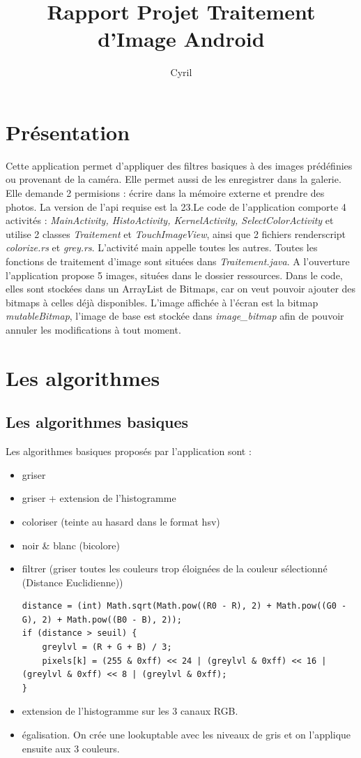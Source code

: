 \documentclass[a4paper, 12pt]{report}
\title{Rapport Projet Traitement d'Image Android}
\author{Cyril \bsc {CAULONQUE}}
\date {}
\begin{document}
\maketitle
\newpage
\tableofcontents
\newpage
\section{Présentation}
Cette application permet d'appliquer des filtres basiques à des images prédéfinies ou provenant de la caméra. Elle permet aussi de les enregistrer dans la galerie. Elle demande 2 permisions : écrire dans la mémoire externe et prendre des photos. La version de l'api requise est la 23.\newline Le code de l'application comporte 4 activités : \emph{MainActivity, HistoActivity, KernelActivity, SelectColorActivity} et utilise 2 classes \emph{Traitement} et \emph{TouchImageView}, ainsi que 2 fichiers renderscript \emph{colorize.rs} et \emph{grey.rs}.\newline
L'activité main appelle toutes les autres. Toutes les fonctions de traitement d'image sont situées dans \emph{Traitement.java}.
A l'ouverture l'application propose 5 images, situées dans le dossier ressources. Dans le code, elles sont stockées dans un ArrayList de Bitmaps, car on veut pouvoir ajouter des bitmaps à celles déjà disponibles. L'image affichée à l'écran est la bitmap \emph{mutableBitmap}, l'image de base est stockée dans \emph{image\_bitmap} afin de pouvoir annuler les modifications à tout moment.
\section{Les algorithmes}
\subsection{Les algorithmes basiques}
Les algorithmes basiques proposés par l'application sont :\newline
\begin{itemize}
\item griser
\item griser + extension de l'histogramme
\item coloriser (teinte au hasard dans le format hsv)
\item noir \& blanc (bicolore)
\item filtrer (griser toutes les couleurs trop éloignées de la couleur sélectionné (Distance Euclidienne))
\begin{lstlisting}[frame=single]
distance = (int) Math.sqrt(Math.pow((R0 - R), 2) + Math.pow((G0 - G), 2) + Math.pow((B0 - B), 2));
if (distance > seuil) {
    greylvl = (R + G + B) / 3;
    pixels[k] = (255 & 0xff) << 24 | (greylvl & 0xff) << 16 | (greylvl & 0xff) << 8 | (greylvl & 0xff);
}
\end{lstlisting}
\item extension de l'histogramme sur les 3 canaux RGB.
\item égalisation. On crée une lookuptable avec les niveaux de gris et on l'applique ensuite aux 3 couleurs.
\end {itemize}
\end{document}
